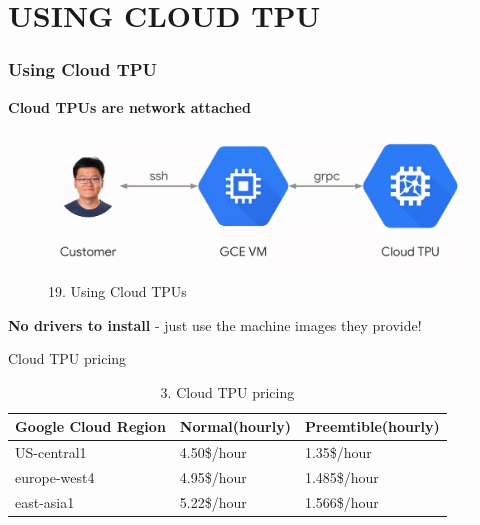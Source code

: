 \documentclass[c]{beamer}
\begin{document}
	\section{USING CLOUD TPU}
	\begin{frame}
	\frametitle{Using Cloud TPU}
	\begin{center}\textbf{ Cloud TPUs are network attached}
	\begin{figure}
            \centering
            \includegraphics[scale=.36]{images/19usingcloudtpu.png}
            \caption{19. Using Cloud TPUs }
            \label{graph:performance per watt}
        \end{figure}
        \linebreak
{\small \textbf{No drivers to install} - just use \linebreak the machine images they provide!}
\end{center}
	\end{frame}
	\begin{frame}{Cloud TPU pricing}
	\begin{table}
	\hfill
	\begin{tabular}{|p{3.6cm}|| p{3.5cm}||p{3.5cm}|}
	\hline

	{\small \textbf{\newline Google Cloud Region \newline}}  & {\small \textbf{\newline Normal(hourly)}} & {\small \textbf{\newline Preemtible(hourly)}} \\
	\hline \hline
	{\small US-central1 \newline} & {\small 4.50\$/hour}& {\small 1.35\$/hour} \\
	\hline
	{\small europe-west4 \newline} & {\small 4.95\$/hour} &  {\small 1.485\$/hour}  \\
	\hline
{\small east-asia1 \newline} & {\small 5.22\$/hour} & {\small 1.566\$/hour} \\
	\hline
	\end{tabular}
	\caption{3. Cloud TPU pricing}
	 \label{tab:tab3}
	\end{table}
	\end{frame}
\end{document}
